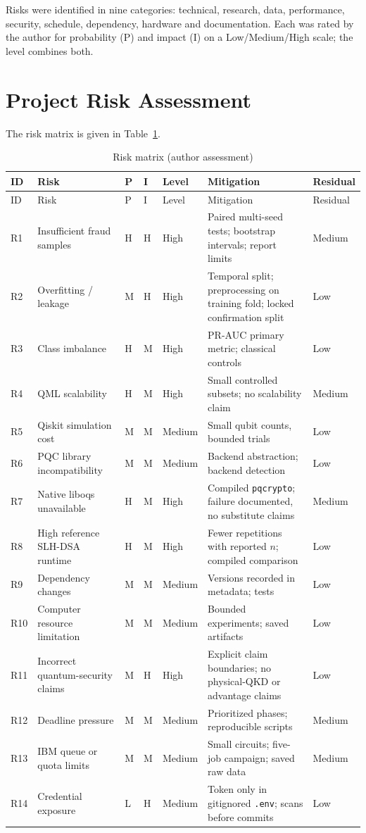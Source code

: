 Risks were identified in nine categories: technical, research, data, performance, security, schedule, dependency, hardware and documentation. Each was rated by the author for probability (P) and impact (I) on a Low/Medium/High scale; the level combines both.

\section{Project Risk Assessment}
The risk matrix is given in Table~\ref{tab:risk}.
\begin{longtable}{@{}p{0.8cm}p{3.6cm}p{0.9cm}p{0.9cm}p{1.2cm}p{4.0cm}p{2.2cm}@{}}
\caption{Risk matrix (author assessment)}\label{tab:risk}\\
\toprule ID & Risk & P & I & Level & Mitigation & Residual\\ \midrule \endfirsthead
\toprule ID & Risk & P & I & Level & Mitigation & Residual\\ \midrule \endhead
R1 & Insufficient fraud samples & H & H & High & Paired multi-seed tests; bootstrap intervals; report limits & Medium\\
R2 & Overfitting / leakage & M & H & High & Temporal split; preprocessing on training fold; locked confirmation split & Low\\
R3 & Class imbalance & H & M & High & PR-AUC primary metric; classical controls & Low\\
R4 & QML scalability & H & M & High & Small controlled subsets; no scalability claim & Medium\\
R5 & Qiskit simulation cost & M & M & Medium & Small qubit counts, bounded trials & Low\\
R6 & PQC library incompatibility & M & M & Medium & Backend abstraction; backend detection & Low\\
R7 & Native liboqs unavailable & H & M & High & Compiled \texttt{pqcrypto}; failure documented, no substitute claims & Medium\\
R8 & High reference SLH-DSA runtime & H & M & High & Fewer repetitions with reported $n$; compiled comparison & Low\\
R9 & Dependency changes & M & M & Medium & Versions recorded in metadata; tests & Low\\
R10 & Computer resource limitation & M & M & Medium & Bounded experiments; saved artifacts & Low\\
R11 & Incorrect quantum-security claims & M & H & High & Explicit claim boundaries; no physical-QKD or advantage claims & Low\\
R12 & Deadline pressure & M & M & Medium & Prioritized phases; reproducible scripts & Medium\\
R13 & IBM queue or quota limits & M & M & Medium & Small circuits; five-job campaign; saved raw data & Medium\\
R14 & Credential exposure & L & H & Medium & Token only in gitignored \texttt{.env}; scans before commits & Low\\
\bottomrule
\end{longtable}
